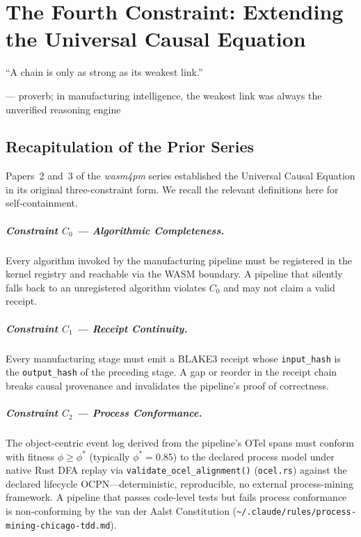 
\chapter{The Fourth Constraint: Extending the Universal Causal Equation}
\label{chap:fourth-constraint}

\epigraph{%
  ``A chain is only as strong as its weakest link.''
}{--- proverb; in manufacturing intelligence, the weakest link was always the unverified reasoning engine}

\section{Recapitulation of the Prior Series}
\label{sec:prior-series}

Papers~2 and~3 of the \emph{wasm4pm} series established the Universal Causal Equation
in its original three-constraint form. We recall the relevant definitions here for
self-containment.

\paragraph{Constraint $C_0$ — Algorithmic Completeness.}
Every algorithm invoked by the manufacturing pipeline must be registered in the kernel
registry and reachable via the WASM boundary. A pipeline that silently falls back to an
unregistered algorithm violates $C_0$ and may not claim a valid receipt.

\paragraph{Constraint $C_1$ — Receipt Continuity.}
Every manufacturing stage must emit a BLAKE3 receipt whose \texttt{input\_hash} is the
\texttt{output\_hash} of the preceding stage. A gap or reorder in the receipt chain
breaks causal provenance and invalidates the pipeline's proof of correctness.

\paragraph{Constraint $C_2$ — Process Conformance.}
The object-centric event log derived from the pipeline's OTel spans must conform with
fitness $\phi \geq \phi^*$ (typically $\phi^* = 0.85$) to the declared process model
under native Rust DFA replay via \texttt{validate\_ocel\_alignment()} (\texttt{ocel.rs}) against the declared lifecycle OCPN---deterministic, reproducible, no external process-mining framework. A pipeline that passes code-level tests but fails
process conformance is non-conforming by the van der Aalst Constitution
(\texttt{\textasciitilde/.claude/rules/process-mining-chicago-tdd.md}).

